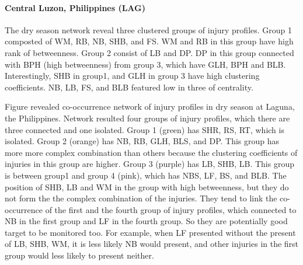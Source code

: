 \paragraph{Central Luzon, Philippines (LAG)}

The dry season network reveal three clustered groups of injury profiles. Group 1 composted of WM, RB, NB, SHB, and FS. WM and RB in this group have high rank of betweenness. Group 2 consist of LB and DP. DP in this group connected with BPH (high betweenness) from group 3, which have GLH, BPH and BLB. Interestingly, SHB in group1, and GLH in group 3 have high clustering coefficients. NB, LB, FS, and BLB featured low in three of centrality. 

Figure revealed co-occurrence network of injury profiles in dry season at Laguna, the Philippines. Network resulted four groups of injury profiles, which there are three connected and one isolated. Group 1 (green) has  SHR, RS, RT, which is isolated. Group 2 (orange) has NB, RB, GLH, BLS, and DP. This group has more more complex combination than others because the clustering coefficients of injuries in this group are higher. Group 3 (purple) has LB, SHB, LB. This group is between group1 and group 4 (pink), which has NBS, LF, BS, and BLB. The position of SHB, LB and WM in the group with high betweenness, but they do not form the the complex combination of the injuries. They tend to link the co-occurrence of the first and the fourth group of injury profiles, which connected to NB in the first group and LF in the fourth group. So they are potentially good target to be monitored too. For example, when LF presented without the present of LB, SHB, WM, it is less likely NB would present, and other injuries in the first group would less likely to present neither. 

